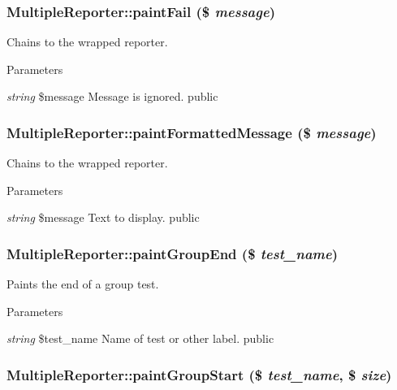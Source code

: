 \hypertarget{class_multiple_reporter_adbf0d817ea66a3ed6ecbfaa12da81b55}{
\subsubsection[{paintFail}]{\setlength{\rightskip}{0pt plus 5cm}MultipleReporter::paintFail (\$ {\em message})}}
\label{class_multiple_reporter_adbf0d817ea66a3ed6ecbfaa12da81b55}
Chains to the wrapped reporter. 
\begin{DoxyParams}{Parameters}
\item[{\em string}]\$message Message is ignored.  public \end{DoxyParams}
\hypertarget{class_multiple_reporter_aac9b1303434bbeb6a558af840590866e}{
\subsubsection[{paintFormattedMessage}]{\setlength{\rightskip}{0pt plus 5cm}MultipleReporter::paintFormattedMessage (\$ {\em message})}}
\label{class_multiple_reporter_aac9b1303434bbeb6a558af840590866e}
Chains to the wrapped reporter. 
\begin{DoxyParams}{Parameters}
\item[{\em string}]\$message Text to display.  public \end{DoxyParams}
\hypertarget{class_multiple_reporter_a46f66fdc2d08ab56480df66374523e22}{
\subsubsection[{paintGroupEnd}]{\setlength{\rightskip}{0pt plus 5cm}MultipleReporter::paintGroupEnd (\$ {\em test\_\-name})}}
\label{class_multiple_reporter_a46f66fdc2d08ab56480df66374523e22}
Paints the end of a group test. 
\begin{DoxyParams}{Parameters}
\item[{\em string}]\$test\_\-name Name of test or other label.  public \end{DoxyParams}
\hypertarget{class_multiple_reporter_a124c97c84dc679cc6ad14aa2012bb444}{
\subsubsection[{paintGroupStart}]{\setlength{\rightskip}{0pt plus 5cm}MultipleReporter::paintGroupStart (\$ {\em test\_\-name}, \/  \$ {\em size})}}

